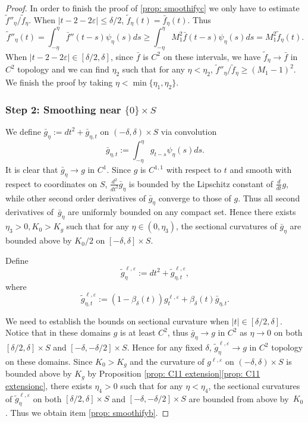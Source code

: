 \documentclass[10pt]{amsart}
\theoremstyle{definition}
\let\eps\varepsilon
\renewcommand{\>}{{\rangle}}
\newcommand{\<}{{\langle}}
\begin{document}
\begin{proof}
In order to finish the proof of \eqref{prop: smoothifyc} we only have to estimate $\tilde{f}''_{\eta}/\tilde{f}_{\eta}$. When $|t-2-2\eps|\leq \delta/2$, $\tilde{f}_{\eta}(t)=\bar{f}_{\eta}(t)$. Thus
\[
\tilde{f}''_{\eta}(t)=\int_{-\eta}^{\eta}\bar{f}''(t-s)\psi_{\eta}(s)ds
\geq \int_{-\eta}^{\eta}M_1^2\bar{f}(t-s)\psi_{\eta}(s)ds=M_1^2\tilde{f}_{\eta}(t).
\]
When $|t-2-2\eps|\in [\delta/2,\delta]$, since $\bar{f}$ is $C^2$ on these intervals, we have $\tilde{f}_{\eta}\to \bar{f}$ in $C^2$ topology and we can find $\eta_2$ such that for any $\eta<\eta_2$, $\tilde{f}''_{\eta}/\tilde{f}_{\eta}\geq (M_1-1)^2$. We finish the proof by taking $\eta<\min\{\eta_1, \eta_2\}$.

\subsubsection*{Step 2: Smoothing near $\{0\}\times S$}
We define $\bar{g}_{\eta}:=dt^2+\bar{g}_{\eta,t}$ on $(-\delta,\delta)\times S$ via convolution
\[
\bar{g}_{\eta,t}:=\int_{-\eta}^{\eta}g_{t-s}\psi_\eta(s)ds.
\]
It is clear that $\bar{g}_{\eta}\to g$ in $C^1$. Since $g$ is $C^{1,1}$ with respect to $t$ and smooth with respect to coordinates on $S$, $\frac{d^2}{dt^2}\bar{g}_{\eta}$ is bounded by the Lipschitz constant of $\frac{d}{dt}g$, while other second order derivatives of $\bar{g}_{\eta}$ converge to those of $g$. Thus all second derivatives of~$\bar{g}_{\eta}$ are uniformly bounded on any compact set. Hence there exists $\eta_3>0, K_0>K_g$ such that for any $\eta\in (0,\eta_3)$, the sectional curvatures of $\bar{g}_{\eta}$ are bounded above by $K_0/2$ on $[-\delta,\delta]\times S$.

Define
\[
\tilde{g}^{\ell,\eps}_{\eta}:=dt^2+\tilde{g}^{\ell,\eps}_{\eta,t},
\]
where
\[
\tilde{g}^{\ell,\eps}_{\eta,t}:=(1-\beta_\delta(t))g^{\ell,\eps}_t+\beta_\delta(t)\bar{g}^{}_{\eta,t}.
\]

We need to establish the bounds on sectional curvature when $|t|\in [\delta/2,\delta]$. Notice that in these domains $g$ is at least $C^2$, thus $\bar{g}^{}_{\eta}\to g$ in $C^2$ as $\eta\to 0$ on both $[\delta/2, \delta]\times S$ and $ [-\delta, -\delta/2]\times S$.
Hence for any fixed $\delta$, $\tilde{g}^{\ell,\eps}_{\eta}\to g$ in $C^2$ topology on these domains. Since $K_0>K_g$ and the curvature of $g^{\ell,\eps}$ on $(-\delta, \delta)\times S$ is bounded above by $K_g$ by Proposition \ref{prop: C11 extension}\eqref{prop: C11 extensionc}, there exists $\eta_4>0$ such that for any $\eta<\eta_4$, the sectional curvatures of $\tilde{g}^{\ell,\eps}_{\eta}$ on both $[\delta/2, \delta]\times S$ and $ [-\delta, -\delta/2]\times S$ are bounded from above by~$K_0$. Thus we obtain item \eqref{prop: smoothifyb}.


\end{proof}
\end{document}
